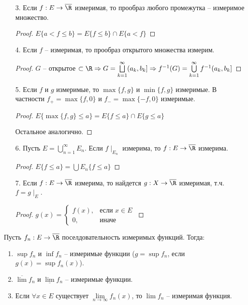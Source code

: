 \begin{enumerate}
    \item[3.] Если $f:E\rightarrow \overline{\R}$ измеримая, то прообраз любого 
    промежутка – измеримое множество.

    \begin{proof}
        $E\{a < f \leq b\}=E\{f \leq b\}\cap E\{a < f\}$
    \end{proof}

    \item[4.] Если $f$ – измеримая, то прообраз открытого множества измерим.
    \begin{proof}
        $G$ – открытое $\subset \R\Rightarrow G = \bigsqcup\limits_{k=1}^\infty (a_k, b_k]\Rightarrow
        f^{-1}(G)=\bigcup\limits_{k=1}^\infty f^{-1}(a_k, b_k]$
    \end{proof}

    \item[5.] Если $f$ и $g$ измеримые, то $\max\{f, g\}$ и $\min\{f, g\}$ измеримые. 
    В частности $f_+=\max\{f, 0\}$ и $f_-=\max\{-f, 0\}$ измеримые.

    \begin{proof}
        $E\{\max\{f, g\} \leq a\}=E\{f \leq a\}\cap E\{g \leq a\}$

        Остальное аналогично.
    \end{proof}

    \item[6.] Пусть $E=\bigcup\limits_{n=1}^\infty E_n$. Если $f\mid_{E_n}$ измерима, то $f:E\rightarrow \overline{\R}$ измерима.
    
    \begin{proof}
        $E\{f\leq a\}=\bigcup E_n\{f\leq a\}$
    \end{proof}

    \item[7.] Если $f:E\rightarrow \overline{\R}$ измерима, то найдется $g:X\rightarrow\overline{\R}$ измеримая, 
    т.ч. $f=g\mid_E$.

    \begin{proof}
        $g(x)=\left\{ \begin{array}{ll}
            f(x), & \text{если } x\in E \\
            0, & \text{иначе}
        \end{array}\right.$
    \end{proof}
\end{enumerate}

\begin{theorem}
    Пусть $f_n:E\rightarrow\overline{\R}$ поселдовательность измеримых функций. Тогда:

    \begin{enumerate}
        \item $\sup f_n$ и $\inf f_n$ – измеримые функции ($g=\sup f_n$, если $g(x)=\sup f_n(x)$).
        \item $\overline{\lim} f_n$ и $\underline{\lim} f_n$ – измеримые функции.
        \item Если $\forall x\in E$ существует $\lim\limits_{n\rightarrow \infty} f_n(x)$, то $\lim f_n$ – измеримая функция.
    \end{enumerate}
\end{theorem}

